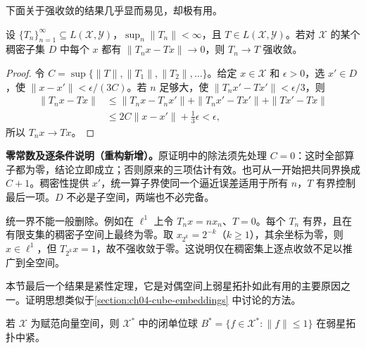 \documentclass[../../main.tex]{subfiles}
\begin{document}
下面关于强收敛的结果几乎显而易见，却极有用。
\begin{proposition}\label{proposition:ch05-strong-dense-convergence}
设 $\{T_n\}_{n=1}^{\infty}\subseteq L(\mathcal X,\mathcal Y)$，$\sup_n\|T_n\|<\infty$，且 $T\in L(\mathcal X,\mathcal Y)$。若对 $\mathcal X$ 的某个稠密子集 $D$ 中每个 $x$ 都有 $\|T_nx-Tx\|\to0$，则 $T_n\to T$ 强收敛。
\end{proposition}
\begin{proof}
令 $C=\sup\{\|T\|,\|T_1\|,\|T_2\|,\ldots\}$。给定 $x\in\mathcal X$ 和 $\epsilon>0$，选 $x'\in D$，使 $\|x-x'\|<\epsilon/(3C)$。若 $n$ 足够大，使 $\|T_nx'-Tx'\|<\epsilon/3$，则
\begin{align*}
\|T_nx-Tx\|&\le\|T_nx-T_nx'\|+\|T_nx'-Tx'\|+\|Tx'-Tx\|\\
&\le2C\|x-x'\|+\tfrac13\epsilon<\epsilon,
\end{align*}
所以 $T_nx\to Tx$。
\end{proof}
\begin{remark}
\textbf{零常数及逐条件说明（重构新增）。}原证明中的除法须先处理 $C=0$：这时全部算子都为零，结论立即成立；否则原来的三项估计有效。也可从一开始把共同界换成 $C+1$。稠密性提供 $x'$，统一算子界使同一个逼近误差适用于所有 $n$，$T$ 有界控制最后一项。$D$ 不必是子空间，两端也不必完备。

统一界不能一般删除。例如在 $\ell^1$ 上令 $T_nx=nx_n$、$T=0$。每个 $T_n$ 有界，且在有限支集的稠密子空间上最终为零。取 $x_{2^k}=2^{-k}$（$k\ge1$），其余坐标为零，则 $x\in\ell^1$，但 $T_{2^k}x=1$，故不强收敛于零。这说明仅在稠密集上逐点收敛不足以推广到全空间。
\end{remark}
本节最后一个结果是紧性定理，它是对偶空间上弱星拓扑如此有用的主要原因之一。证明思想类似于\cref{section:ch04-cube-embeddings} 中讨论的方法。
\begin{theorem}[Alaoglu 定理]\label{theorem:ch05-alaoglu}
若 $\mathcal X$ 为赋范向量空间，则 $\mathcal X^*$ 中的闭单位球 $B^*=\{f\in\mathcal X^*:\|f\|\le1\}$ 在弱星拓扑中紧。
\end{theorem}
\end{document}
